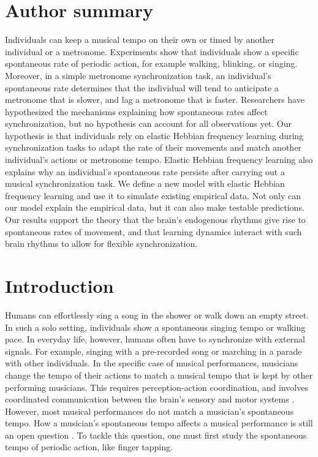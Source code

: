 \documentclass[10pt,letterpaper]{article}
\begin{document}
\section*{Author summary}
Individuals can keep a musical tempo on their own or timed by another individual or a metronome. Experiments show that individuals show a specific spontaneous rate of periodic action, for example walking, blinking, or singing. Moreover, in a simple metronome synchronization task, an individual's spontaneous rate determines that the individual will tend to anticipate a metronome that is slower, and lag a metronome that is faster. Researchers have hypothesized the mechanisms explaining how spontaneous rates affect synchronization, but no hypothesis can account for all observations yet. Our hypothesis is that individuals rely on elastic Hebbian frequency learning during synchronization tasks to adapt the rate of their movements and match another individual's actions or metronome tempo. Elastic Hebbian frequency learning also explains why an individual's spontaneous rate persists after carrying out a musical synchronization task. We define a new model with elastic Hebbian frequency learning and use it to simulate existing empirical data. Not only can our model explain the empirical data, but it can also make testable predictions. Our results support the theory that the brain's endogenous rhythms give rise to spontaneous rates of movement, and that learning dynamics interact with such brain rhythms to allow for flexible synchronization.

\linenumbers

\section*{Introduction}

Humans can effortlessly sing a song in the shower or walk down an empty street. In such a solo setting, individuals show a spontaneous singing tempo or walking pace. In everyday life, however, humans often have to synchronize with external signals. For example, singing with a pre-recorded song or marching in a parade with other individuals. In the specific case of musical performances, musicians change the tempo of their actions to match a musical tempo that is kept by other performing musicians. This requires perception-action coordination, and involves coordinated communication between the brain's sensory and motor systems \cite{ridderinkhof2014neurocognitive}. However, most musical performances do not match a musician's spontaneous tempo. How a musician's spontaneous tempo affects a musical performance is still an open question \cite{zamm2018musicians}. To tackle this question, one must first study the spontaneous tempo of periodic action, like finger tapping. 
\end{document}
